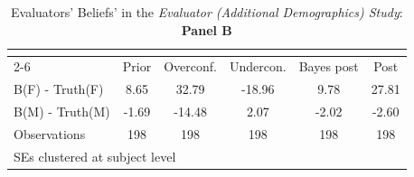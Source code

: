 \begin{table}[htbp]\centering
\caption{Evaluators' Beliefs' in the \textit{Evaluator (Additional Demographics) Study}: \textbf{Panel B}}
\begin{tabular}{l*{5}{c}}
\hline\hline
                &\multicolumn{5}{c}{}                             \\\cmidrule(lr){2-6}
                &\multicolumn{1}{c}{Prior}&\multicolumn{1}{c}{Overconf.}&\multicolumn{1}{c}{Undercon.}&\multicolumn{1}{c}{Bayes post}&\multicolumn{1}{c}{Post}\\
\hline
B(F) - Truth(F) &     8.65&    32.79&   -18.96&     9.78&    27.81\\
B(M) - Truth(M) &    -1.69&   -14.48&     2.07&    -2.02&    -2.60\\
\hline
Observations    &      198&      198&      198&      198&      198\\
\hline\hline
\multicolumn{6}{l}{\footnotesize SEs clustered at subject level}\\
\end{tabular}
\end{table}
